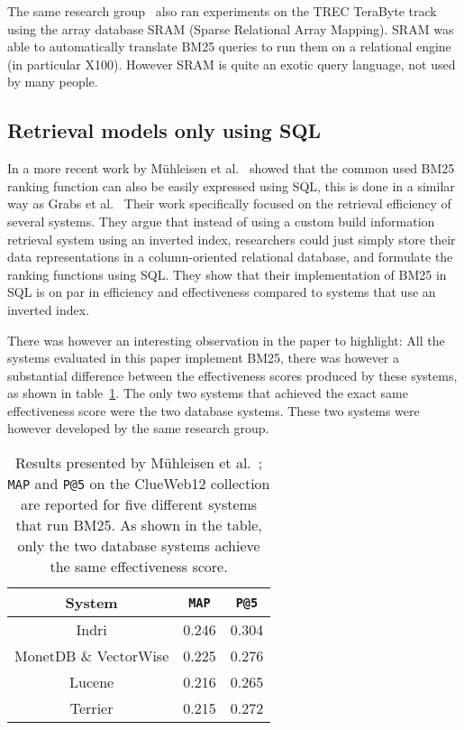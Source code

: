 The same research group~\cite{array-db} also ran experiments on the TREC TeraByte track using the array database SRAM (Sparse Relational Array Mapping). SRAM was able to automatically translate BM25 queries to run them on a relational engine (in particular X100). However SRAM is quite an exotic query language, not used by many people. 

\subsection{Retrieval models only using SQL}
In a more recent work by M\"{u}hleisen et al.~\cite{OldDog} showed that the common used BM25 ranking function can also be easily expressed using SQL, this is done in a similar way as Grabs et al.~\cite{PowerDB-IR} Their work specifically focused on the retrieval efficiency of several systems. They argue that instead of using a custom build information retrieval system using an inverted index, researchers could just simply store their data representations in a column-oriented relational database, and formulate the ranking functions using SQL. They show that their implementation of BM25 in SQL is on par in efficiency and effectiveness compared to systems that use an inverted index. 

There was however an interesting observation in the paper to highlight: All the systems evaluated in this paper implement BM25, there was however a substantial difference between the effectiveness scores produced by these systems, as shown in table~\ref{olddog_results}. The only two systems that achieved the exact same effectiveness score were the two database systems. These two systems were however developed by the same research group.

\begin{table}[!ht]
	\centering
	\caption{Results presented by M\"{u}hleisen et al.~\cite{OldDog}; \texttt{MAP} and \texttt{P@5} on the ClueWeb12 collection are reported for five different systems that run BM25. As shown in the table, only the two database systems achieve the same effectiveness score.}
	\label{olddog_results}
	\begin{tabular}{c c c}
		\toprule
		System &  \texttt{MAP} & \texttt{P@5} \\
		\midrule
		Indri & 0.246 & 0.304 \\
		MonetDB \& VectorWise & 0.225 & 0.276 \\
		Lucene & 0.216 & 0.265 \\
		Terrier & 0.215 & 0.272 \\
		\bottomrule
	\end{tabular}
\end{table}

